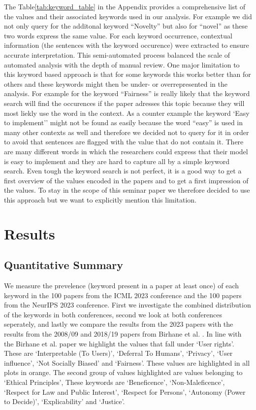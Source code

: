\documentclass{article}
\begin{document}
The Table\ref{tab:keyword_table} in the Appendix provides a comprehensive list of the values and their associated keywords used in our analysis.
For example we did not only query for the additonal keyword ``Novelty'' but also for ``novel'' as these two
words express the same value. 
For each keyword occurrence, contextual information (the sentences with the keyword occurence) were extracted to ensure accurate interpretation. 
This semi-automated process balanced the scale of automated analysis with the depth of manual review. One major limitation to this keyword based approach is 
that for some keywords this works better than for others and these keywords might then be under- or overrepresented in the analysis. For example for the keyword ``Fairness'' is really likely that the 
keyword search will find the occurences if the paper adresses this topic because they will most liekly use the word in the context. 
As a counter example the keyword `Easy to implement'' might not be found as easily because the word ``easy'' is used in many other contexts as well and therefore we decided not to query for it in order to avoid that sentences are flagged with 
the value that do not contain it.
There are many different words in which the researchers could express that their model is easy to implement and they are hard to capture all by a simple keyword search.
Even tough the keyword search is not perfect, it is a good way to get a first overview of the values encoded in the papers and to get a first impression of the values. To stay in the scope of this seminar paper 
we therefore decided to use this approach but we want to explicitly mention this limitation.

\section{Results}
\subsection{Quantitative Summary}
We measure the prevelence (keyword present in a paper at least once) of each keyword in the 100 papers from the ICML 2023 conference and the 100 papers from the NeurIPS 2023 conference. First we investigate the combined distribution of the keywords in both conferences, second we look at both conferences seperately,
and lastly we compare the results from the 2023 papers with the results from the 2008/09 and 2018/19 papers from Birhane et al. \cite{valuesInML2021}. 
In line with the Birhane et al. paper we highlight the values that fall under `User rights'. These are `Interpretable (To Users)', `Deferral To Humans', `Privacy', `User influence', `Not Socially Biased' and `Fairness'. 
These values are highlighted in all plots in orange. The second group of values highlighted are values belonging to `Ethical Principles', These keywords are `Beneficence', `Non-Maleficence', `Respect for Law and Public Interest', 
`Respect for Persons', `Autonomy (Power to Decide)', `Explicability' and `Justice'.
\end{document}
